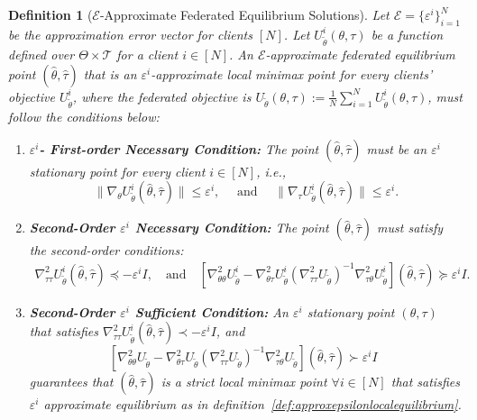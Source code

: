 \documentclass{article}
\newtheorem{definition}{Definition}%
\theoremstyle{definition}
\begin{document}
\begin{definition}[$\mathcal{E}$-Approximate Federated Equilibrium Solutions]\label{def:epsilonequilibrium}    	  
Let $\mathcal{E}=\{\varepsilon^i\}^N_{i=1}$ be the approximation error vector for clients $[N] $. Let $ U_{\tilde\theta}^i(\theta, \tau) $ be a function defined over $ \Theta \times \mathcal{T} $ for a client $i\in[N]$. An $\mathcal{E}$-approximate federated equilibrium point $ (\hat\theta, \hat\tau) $ that is an $\varepsilon^i$-approximate local minimax point for every clients' objective $U_{\tilde{\theta}}^i$, where the federated objective is $U_{\tilde{\theta}}(\theta, \tau) := \frac{1}{N} \sum_{i=1}^N U_{\tilde{\theta}}^i(\theta, \tau)$, must follow the conditions below:
\begin{enumerate}[parsep=0pt,topsep=0pt,leftmargin=*,itemsep=0pt]
\label{def:eps_equilibrium}
    \item \textbf{$\varepsilon^i$- First-order Necessary Condition:}  
    The point $ (\hat\theta, \hat\tau) $ must be an $ \varepsilon^i $ stationary point for every client $i\in[N]$, i.e.,  
    \begin{equation*}
	    \|\nabla_{\theta} U_{\tilde\theta}^i(\hat\theta, \hat\tau)\| \leq \varepsilon^i, 
        \quad \text{ and } \quad 
        \|\nabla_{\tau} U_{\tilde\theta}^i(\hat\theta, \hat\tau)\| \leq \varepsilon^i.
    \end{equation*}  
    
    \item \textbf{Second-Order $\varepsilon^i$ Necessary Condition:}  
    The point $ (\hat\theta, \hat\tau) $ must satisfy the second-order conditions:  
    \begin{align*}
     \nabla^2_{\tau\tau} U^i_{\tilde\theta}(\hat\theta, \hat\tau) \preceq -\varepsilon^i I, 
        \quad\text{and}\quad \left[\nabla_{\theta\theta}^2U_{\tilde\theta}^i-\nabla_{\theta\tau}^2U_{\tilde\theta}^i\left(\nabla_{\tau\tau}^2U_{\tilde\theta}\right)^{-1}\nabla_{\tau\theta}^2U_{\tilde\theta}^i\right](\hat\theta,\hat\tau) \succeq \varepsilon^i I.
    \end{align*}  
    \item \textbf{Second-Order $\varepsilon^i$ Sufficient Condition:} An $\varepsilon^i$ stationary point $(\theta,\tau)$ that satisfies $\nabla_{\tau\tau}^2U_{\tilde\theta}^i(\hat\theta,\hat\tau)\prec-\varepsilon^i I$, and
         \begin{equation*}
		\left[\nabla_{\theta\theta}^2U_{\tilde\theta}-\nabla_{\theta\tau}^2U_{\tilde\theta}\left(\nabla_{\tau\tau}^2U_{\tilde\theta}\right)^{-1}\nabla_{\tau\theta}^2U_{\tilde\theta}\right](\hat\theta,\hat\tau)\succ \varepsilon^i I~~
        \end{equation*}
        guarantees that $(\hat\theta,\hat\tau)$ is a strict local minimax point $\forall i\in[N]$ that satisfies $\varepsilon^i$ approximate equilibrium as in definition~\ref{def:approxepsilonlocalequilibrium}.
\end{enumerate}
\end{definition}
\end{document}
